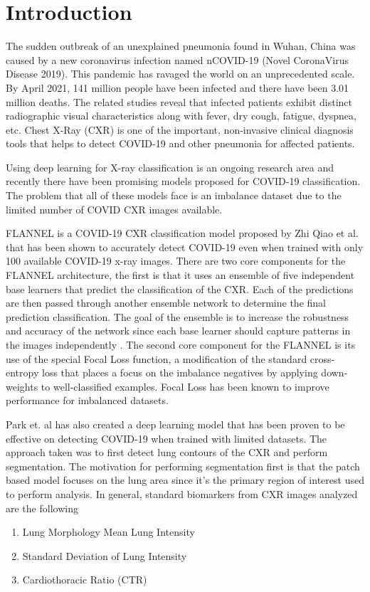 \documentclass{sigkddExp}
\begin{document}
\section{Introduction}
The sudden outbreak of an unexplained pneumonia found in Wuhan, China was
caused by a new coronavirus infection named nCOVID-19 (Novel CoronaVirus Disease
2019). This pandemic has ravaged the world on an unprecedented scale. By April
2021, 141 million people have been infected and there have been 3.01 million
deaths. The related studies reveal that infected patients exhibit distinct
radiographic visual characteristics along with fever, dry cough, fatigue,
dyspnea, etc. Chest X-Ray (CXR) is one of the important, non-invasive
clinical diagnosis tools that helps to detect COVID-19 and other pneumonia for
affected patients.

Using deep learning for X-ray classification is an ongoing research area and
recently there have been promising models proposed for COVID-19 classification.
The problem that all of these models face is an imbalance dataset due to the
limited number of COVID CXR images available.

FLANNEL is a COVID-19 CXR classification model proposed by Zhi Qiao et al.
\cite{10.1093/jamia/ocaa280} that has been shown to accurately detect COVID-19
even when trained with only 100 available COVID-19 x-ray images. There are two
core components for the FLANNEL architecture, the first is that it uses an
ensemble \cite{58871} of five independent base learners that predict the
classification of the CXR. Each of the predictions are then passed through
another ensemble network to determine the final prediction classification. The
goal of the ensemble is to increase the robustness and accuracy of the network
since each base learner should capture patterns in the images independently
\cite{combine}. The second core component for the FLANNEL is its use of the
special Focal Loss \cite{lin2018focal} function, a modification of the standard
cross-entropy loss that places a focus on the imbalance negatives by applying
down-weights to well-classified examples. Focal Loss has been known to improve
performance for imbalanced datasets.

Park et. al \cite{pmid32396075} has also created a deep learning model that has
been proven to be effective on detecting COVID-19 when trained with limited
datasets. The approach taken was to first detect lung contours of the CXR and
perform segmentation. The motivation for performing segmentation first is that
the patch based model focuses on the lung area since it’s the primary region of
interest used to perform analysis.  In general, standard biomarkers
\cite{pmid32396075} from CXR images analyzed are the following
\begin{enumerate}
    \item Lung Morphology Mean Lung Intensity
    \item Standard Deviation of Lung Intensity
    \item Cardiothoracic Ratio (CTR)
\end{enumerate}
\end{document}

